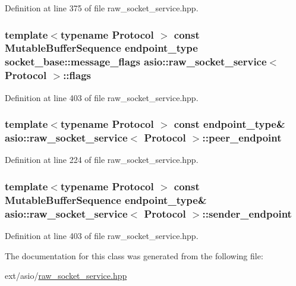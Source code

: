 Definition at line 375 of file raw\+\_\+socket\+\_\+service.\+hpp.

\hypertarget{classasio_1_1raw__socket__service_a5de9c380dbb3006f2945ee2753c3c268}{}
\subsubsection[{flags}]{\setlength{\rightskip}{0pt plus 5cm}template$<$typename Protocol $>$ const Mutable\+Buffer\+Sequence {\bf endpoint\+\_\+type} {\bf socket\+\_\+base\+::message\+\_\+flags} {\bf asio\+::raw\+\_\+socket\+\_\+service}$<$ Protocol $>$\+::flags}\label{classasio_1_1raw__socket__service_a5de9c380dbb3006f2945ee2753c3c268}


Definition at line 403 of file raw\+\_\+socket\+\_\+service.\+hpp.

\hypertarget{classasio_1_1raw__socket__service_ad9ddc4af36bf42586989e53bbd880cd5}{}
\subsubsection[{peer\+\_\+endpoint}]{\setlength{\rightskip}{0pt plus 5cm}template$<$typename Protocol $>$ const {\bf endpoint\+\_\+type}\& {\bf asio\+::raw\+\_\+socket\+\_\+service}$<$ Protocol $>$\+::peer\+\_\+endpoint}\label{classasio_1_1raw__socket__service_ad9ddc4af36bf42586989e53bbd880cd5}


Definition at line 224 of file raw\+\_\+socket\+\_\+service.\+hpp.

\hypertarget{classasio_1_1raw__socket__service_a0b930d4292ec8fdf3e1065f3d033db49}{}
\subsubsection[{sender\+\_\+endpoint}]{\setlength{\rightskip}{0pt plus 5cm}template$<$typename Protocol $>$ const Mutable\+Buffer\+Sequence {\bf endpoint\+\_\+type}\& {\bf asio\+::raw\+\_\+socket\+\_\+service}$<$ Protocol $>$\+::sender\+\_\+endpoint}\label{classasio_1_1raw__socket__service_a0b930d4292ec8fdf3e1065f3d033db49}


Definition at line 403 of file raw\+\_\+socket\+\_\+service.\+hpp.



The documentation for this class was generated from the following file\+:\begin{DoxyCompactItemize}
\item 
ext/asio/\hyperlink{raw__socket__service_8hpp}{raw\+\_\+socket\+\_\+service.\+hpp}\end{DoxyCompactItemize}
